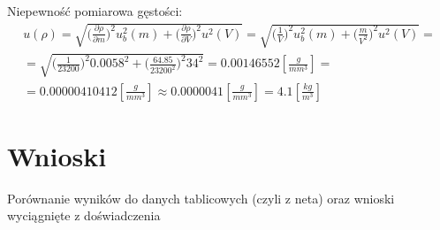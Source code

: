 \documentclass[11pt]{article}
\begin{document}
    Niepewność pomiarowa gęstości:
    \begin{gather*}
        u(\rho)=\sqrt{\biggl(\frac{\partial \rho}{\partial m}\biggr)^2u_b^2(m)+
        \biggl(\frac{\partial \rho}{\partial V}\biggr)^2u^2(V)}
        =\sqrt{\biggl(\frac{1}{V} \biggr)^2u_b^2(m)+
        \biggl(\frac{m}{V^2}\biggr)^2u^2(V)}=\\
        =\sqrt{\biggl(\frac{1}{23200} \biggr)^2 0.0058^2+
        \biggl(\frac{64.85}{23200^2}\biggr)^2 34^2}=0.00146552[\frac{g}{mm^3}]=\\
        =0.00000410412[\frac{g}{mm^3}]\approx 0.0000041[\frac{g}{mm^3}]= 4.1[\frac{kg}{m^3}]
    \end{gather*}
    \section{Wnioski}
    Porównanie wyników do danych tablicowych (czyli z neta) oraz wnioski wyciągnięte z doświadczenia
\end{document}
